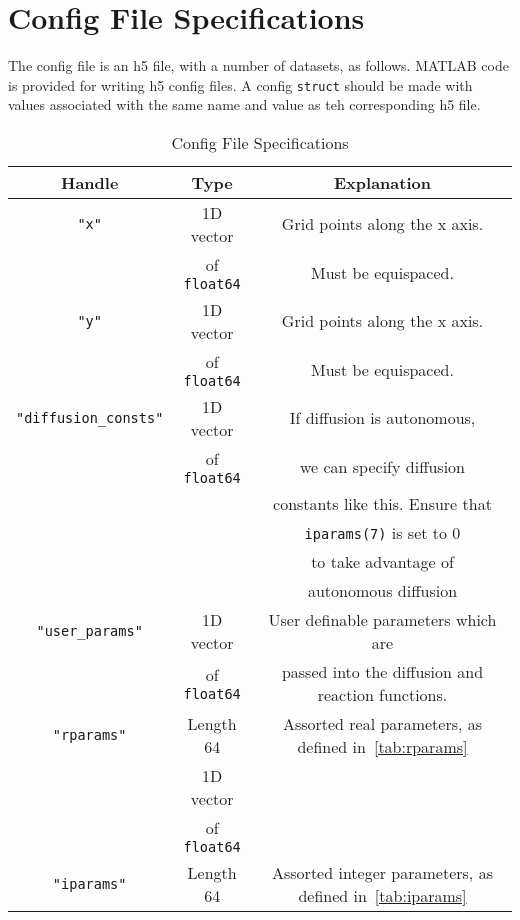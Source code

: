 \documentclass[11pt]{article}
\begin{document}
    \section[Config File Specifications]{Config File Specifications}
    \label{sec:config_file}
    The config file is an h5 file, with a number of datasets, as follows.
    MATLAB code is provided for writing h5 config files. A config \texttt{struct} should be made with values associated with the same name and value as teh corresponding h5 file.
    \begin{table}
        \centering
        \caption{Config File Specifications}
        \label{tab:config}
        \begin{tabular}{c | c | c}
            Handle & Type & Explanation\\
            \hline
            \texttt{"x"} & 1D vector  & Grid points along the x axis. \\
            & of \texttt{float64} &  Must be equispaced.\\
            \hline
            \texttt{"y"} & 1D vector  & Grid points along the x axis. \\
            & of \texttt{float64} &  Must be equispaced.\\
            \hline
            \texttt{"diffusion\_consts"} & 1D vector  & If diffusion is autonomous, \\
            & of \texttt{float64} & we can specify diffusion\\
            & & constants like this. Ensure that\\
            & & \texttt{iparams(7)} is set to 0 \\
            & & to take advantage of\\
            & & autonomous diffusion\\
            \hline
            \texttt{"user\_params"} & 1D vector  & User definable parameters which are \\
            & of \texttt{float64} &  passed into the diffusion and reaction functions.\\
            \hline
            \texttt{"rparams"} & Length 64 & Assorted real parameters, as defined in~\ref{tab:rparams}\\
            & 1D vector & \\
            & of \texttt{float64} & \\
            \hline
            \texttt{"iparams"} & Length 64 & Assorted integer parameters, as defined in~\ref{tab:iparams}\\

\end{tabular}
\end{table}
\end{document}
